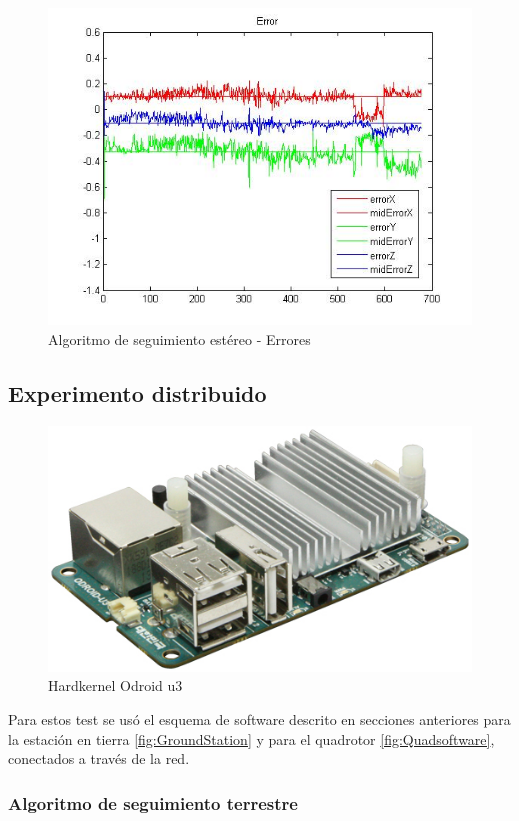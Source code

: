	\begin{figure}[htp]
		\centering
		\includegraphics[width=0.7\linewidth]{../Images/c4/errors_stereo}
		\caption{Algoritmo de seguimiento est\'ereo - Errores}
		\label{fig:errors_stereo_PC}
	\end{figure}	
	

\newpage	
\subsection{Experimento distribuido}
	\label{test_with_odroid_and_GT}
	
	\begin{figure}
		\includegraphics[width=\linewidth]{../Images/c4/odroidu3}
		\caption{Hardkernel Odroid u3}
		\label{fig:odroidu3}
	\end{figure}
		
	Para estos test se us\'o el esquema de software descrito en secciones anteriores para la estaci\'on en tierra \ref{fig:GroundStation} y para el quadrotor \ref{fig:Quadsoftware}, conectados a trav\'es de la red. 
	
	\subsubsection{Algoritmo de seguimiento terrestre}
	
